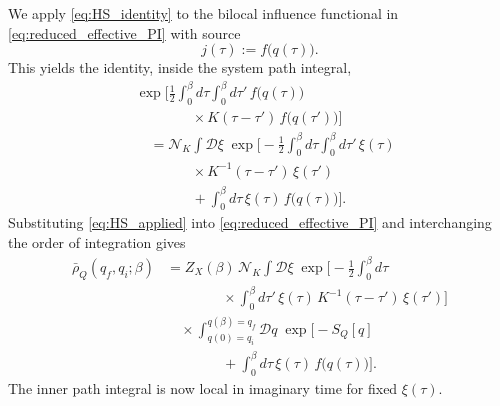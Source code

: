 We apply \eqref{eq:HS_identity} to the bilocal influence functional in
\eqref{eq:reduced_effective_PI} with source
\begin{equation}
    j(\tau) := f\!\big(q(\tau)\big).
\end{equation}
This yields the identity, inside the system path integral,
\begin{align}
    &\exp\!\bigg[
        \frac{1}{2}\int_0^\beta d\tau\int_0^\beta d\tau'\,
        f\!\big(q(\tau)\big)
    \nonumber\\
    &\qquad\qquad\times
        K(\tau-\tau')\,f\!\big(q(\tau')\big)
    \bigg]
    \nonumber\\
    &\quad=
    \mathcal N_K
    \int \mathcal D\xi\;
    \exp\bigg[
        -\frac{1}{2}\int_0^\beta d\tau\int_0^\beta d\tau'\,
        \xi(\tau)
    \nonumber\\
    &\qquad\qquad\times
        K^{-1}(\tau-\tau')\,\xi(\tau')
    \nonumber\\
    &\qquad\qquad
        +\int_0^\beta d\tau\,\xi(\tau)\,f\!\big(q(\tau)\big)
    \bigg].
    \label{eq:HS_applied}
\end{align}
Substituting \eqref{eq:HS_applied} into \eqref{eq:reduced_effective_PI} and
interchanging the order of integration gives
\begin{align}
    \bar\rho_Q(q_f,q_i;\beta)
    &=
    Z_X(\beta)\,\mathcal N_K
    \int \mathcal D\xi\;
    \exp\bigg[
        -\frac{1}{2}\int_0^\beta d\tau
    \nonumber\\
    &\qquad\qquad\times
        \int_0^\beta d\tau'\,
        \xi(\tau)\,K^{-1}(\tau-\tau')\,\xi(\tau')
    \bigg]
    \nonumber\\
    &\quad\times
    \int_{q(0)=q_i}^{q(\beta)=q_f}\!\!\mathcal Dq\;
    \exp\bigg[
        -S_Q[q] 
    \nonumber\\
    &\qquad\qquad
        + \int_0^\beta d\tau\,\xi(\tau)\,f\!\big(q(\tau)\big)
    \bigg].
    \label{eq:reduced_kernel_after_HS}
\end{align}
The inner path integral is now local in imaginary time for fixed $\xi(\tau)$.


